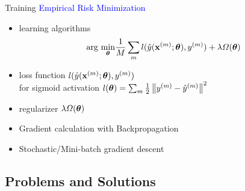 	\begin{frame}[t]{Training}
		\textcolor{blue}{\Large Empirical Risk Minimization}
		\begin{itemize}
		 \item learning algorithms\\
		 \begin{eqnarray}
			\text{arg}~\underset{\boldsymbol{\theta}}{\mathrm{min}} \frac{1}{M}\sum_m l(\hat{y}(\mathbf{x}^{(m)};\boldsymbol{\theta}),y^{(m)}) + \lambda \Omega(\boldsymbol{\theta})\nonumber
			\end{eqnarray}
		 \item loss function $l(\hat{y}(\mathbf{x}^{(m)};\boldsymbol{\theta}),y^{(m)})$ \\
			for sigmoid activation $l(\boldsymbol{\theta})= \sum_m \frac{1}{2} \left\| y^{(m)}-\hat{y}^{(m)}\right\| ^2$\\
		 \item regularizer $\lambda \Omega(\boldsymbol{\theta})$
		\end{itemize}
		
		\begin{itemize}
		 \item Gradient calculation with Backpropagation
		 \item Stochastic/Mini-batch gradient descent
		\end{itemize}

		
		
	\end{frame}
	
	
	\subsection{Problems and Solutions}
		

